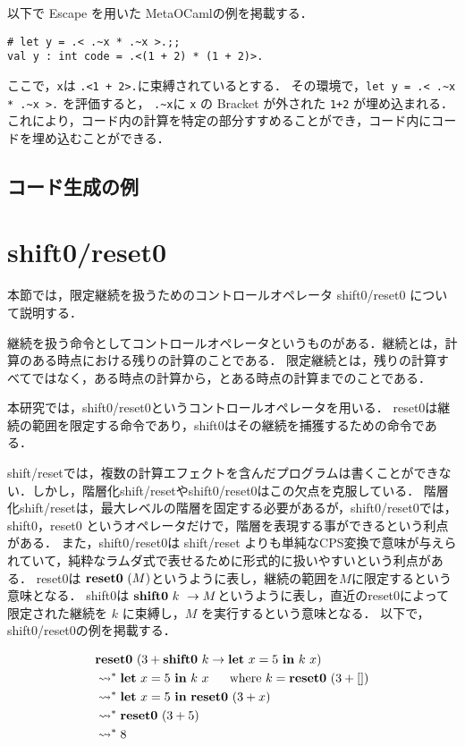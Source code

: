 以下で Escape を用いた MetaOCamlの例を掲載する．
\begin{lstlisting}
# let y = .< .~x * .~x >.;;
val y : int code = .<(1 + 2) * (1 + 2)>.
\end{lstlisting}
ここで，\lstinline|x|は \lstinline|.<1 + 2>.|に束縛されているとする．
その環境で，\lstinline|let y = .< .~x * .~x >.| を評価すると，
\lstinline|.~x|に \lstinline|x| の Bracket が外された \lstinline|1+2| が埋め込まれる．
これにより，コード内の計算を特定の部分すすめることができ，コード内にコードを埋め込むことができる．

\subsection{コード生成の例}

\section{shift0/reset0}
本節では，限定継続を扱うためのコントロールオペレータ shift0/reset0 について説明する．

継続を扱う命令としてコントロールオペレータというものがある．継続とは，計算のある時点における残りの計算のことである．
限定継続とは，残りの計算すべてではなく，ある時点の計算から，とある時点の計算までのことである．

本研究では，shift0/reset0というコントロールオペレータを用いる．
reset0は継続の範囲を限定する命令であり，shift0はその継続を捕獲するための命令である．

shift/reset\cite{Danvy1990}では，複数の計算エフェクトを含んだプログラムは書くことができない．しかし，階層化shift/resetやshift0/reset0はこの欠点を克服している．
階層化shift/reset\cite{Danvy1990}は，最大レベルの階層を固定する必要があるが，shift0/reset0では，shift0，reset0 というオペレータだけで，階層を表現する事ができるという利点がある．
また，shift0/reset0は shift/reset よりも単純なCPS変換で意味が与えられていて，純粋なラムダ式で表せるために形式的に扱いやすいという利点がある．
reset0は $\textbf{reset0}~ (M)$というように表し，継続の範囲を$M$に限定するという意味となる．
shift0は $\textbf{shift0}~ k~ \to M$というように表し，直近のreset0によって限定された継続を $k$ に束縛し，$M$ を実行するという意味となる．
以下で，shift0/reset0の例を掲載する．

\begin{align*}
  &\textbf{reset0}~ (3 + \textbf{shift0}~ k \to \textbf{let}~ x = 5~ \textbf{in}~ k~ x) \\
  &\leadsto^* \textbf{let}~ x = 5~ \textbf{in}~ k~ x ~~~~~\text{where}~k = \textbf{reset0}~ (3 + []) \\
  &\leadsto^* \textbf{let}~ x = 5~ \textbf{in}~ \textbf{reset0}~ (3 + x) \\
  &\leadsto^* \textbf{reset0}~ (3 + 5) \\
  &\leadsto^* 8 \\
\end{align*}


